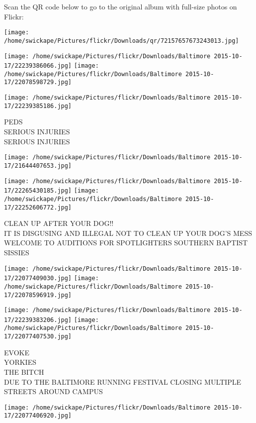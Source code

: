 \documentclass[10pt,letterpaper]{article}
\begin{document}
Scan the QR code below to go to the original album with full-size photos on Flickr:

\texttt{[image: /home/swickape/Pictures/flickr/Downloads/qr/72157657673243013.jpg]}
\pagebreak

\texttt{[image: /home/swickape/Pictures/flickr/Downloads/Baltimore 2015-10-17/22239386066.jpg]}
\texttt{[image: /home/swickape/Pictures/flickr/Downloads/Baltimore 2015-10-17/22078598729.jpg]}

\texttt{[image: /home/swickape/Pictures/flickr/Downloads/Baltimore 2015-10-17/22239385186.jpg]}

PEDS\\
SERIOUS INJURIES\\
SERIOUS INJURIES
\pagebreak

\texttt{[image: /home/swickape/Pictures/flickr/Downloads/Baltimore 2015-10-17/21644407653.jpg]}

\vspace{0.25in}
\texttt{[image: /home/swickape/Pictures/flickr/Downloads/Baltimore 2015-10-17/22265430185.jpg]}
\texttt{[image: /home/swickape/Pictures/flickr/Downloads/Baltimore 2015-10-17/22252606772.jpg]}

CLEAN UP AFTER YOUR DOG!!\\
IT IS DISGUSING AND ILLEGAL NOT TO CLEAN UP YOUR DOG'S MESS\\
WELCOME TO AUDITIONS FOR SPOTLIGHTERS SOUTHERN BAPTIST SISSIES
\pagebreak

\texttt{[image: /home/swickape/Pictures/flickr/Downloads/Baltimore 2015-10-17/22077409030.jpg]}
\texttt{[image: /home/swickape/Pictures/flickr/Downloads/Baltimore 2015-10-17/22078596919.jpg]}

\texttt{[image: /home/swickape/Pictures/flickr/Downloads/Baltimore 2015-10-17/22239383206.jpg]}
\texttt{[image: /home/swickape/Pictures/flickr/Downloads/Baltimore 2015-10-17/22077407530.jpg]}

EVOKE\\
YORKIES\\
THE BITCH\\
DUE TO THE BALTIMORE RUNNING FESTIVAL CLOSING MULTIPLE STREETS AROUND CAMPUS
\pagebreak

\texttt{[image: /home/swickape/Pictures/flickr/Downloads/Baltimore 2015-10-17/22077406920.jpg]}
\end{document}
